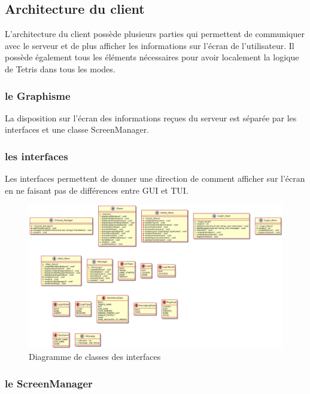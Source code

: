 \documentclass{article}
\begin{document}
\subsection{Architecture du client}

L'architecture du client possède plusieurs parties qui permettent de communiquer avec le serveur et de plus afficher les informations sur l'écran de l'utilisateur. Il possède également tous les éléments nécessaires pour avoir localement la logique de Tetris dans tous les modes.

\subsubsection{le Graphisme}

La disposition sur l'écran des informations reçues du serveur est séparée par les interfaces et une classe ScreenManager.

\subsubsection*{les interfaces}

Les interfaces permettent de donner une direction de comment afficher sur l'écran en ne faisant pas de différences entre GUI et TUI.

\begin{figure}[H]
    \centering
    \includegraphics[scale=0.3]{../res/uml/class/InterfaceClass.png}
    \caption{Diagramme de classes des interfaces}
    \label{fig:InterfaceDiagram}
\end{figure}

\subsubsection*{le ScreenManager}
\end{document}
